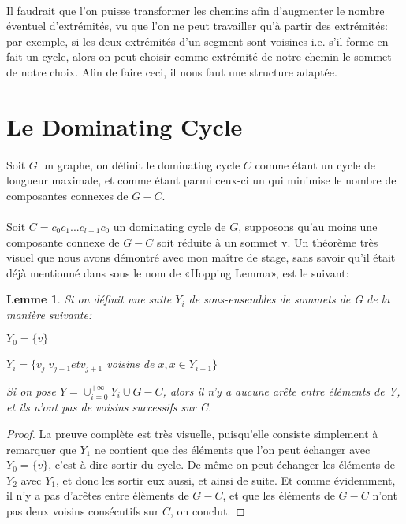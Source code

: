 \documentclass[a4paper]{article}
\newtheorem{lemma}[theorem]{Lemme}
\theoremstyle{definition}
\theoremstyle{remark}
\begin{document}
\paragraph{}
Il faudrait que l'on puisse transformer les chemins afin d'augmenter le
nombre éventuel d'extrémités, vu que l'on ne peut travailler qu'à partir
des extrémités: par exemple, si les deux extrémités d'un segment sont
voisines i.e. s'il forme en fait un cycle, alors on peut choisir comme
extrémité de notre chemin le sommet de notre choix. Afin de faire ceci,
il nous faut une structure adaptée.

\section{Le Dominating Cycle}

\paragraph{}
Soit $G$ un graphe, on définit le dominating cycle $C$ comme étant un 
cycle de longueur maximale, et comme étant parmi ceux-ci un qui minimise 
le nombre de composantes connexes de $G - C$.

\paragraph{}
Soit $C = c_{0} c_{1} ... c_{l-1} c_{0}$ un dominating cycle de $G$,
supposons qu'au moins une composante connexe de $G - C$ soit réduite à un
sommet v. Un théorème très visuel que nous avons démontré avec mon 
maître de stage, sans savoir qu'il était déjà mentionné dans \cite{Woodall} sous le nom de «Hopping Lemma», est le suivant:

\begin{lemma}
Si on définit une suite $Y_{i}$ de sous-ensembles de sommets de G de la manière suivante:

$Y_{0}= \{v \}$

$Y_{i} = \{v_{j} | v_{j-1} et v_{j+1}$ voisins de $x, x \in Y_{i-1}\}$


Si on pose $Y = \cup_{i=0}^{+ \infty} Y_{i} \cup G-C$, alors il n'y a aucune arête entre éléments de Y, et ils n'ont pas de voisins successifs sur C.
\end{lemma}

\begin{proof}
La preuve complète est très visuelle, puisqu'elle consiste simplement à
remarquer que $Y_{1}$ ne contient que des éléments que l'on peut 
échanger avec $Y_{0} = \{v\}$, c'est à dire sortir du cycle. De même  on peut échanger les éléments de $Y_{2}$ avec $Y_{1}$, et donc les sortir 
eux aussi, et ainsi de suite. Et comme évidemment, il n'y a pas d'arêtes
entre élèments de $G-C$, et que les éléments de $G-C$ n'ont pas deux 
voisins consécutifs sur $C$, on conclut.
\end{proof}
\end{document}
